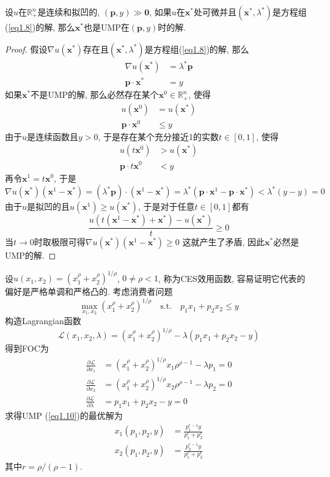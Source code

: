 \documentclass[cn, 12pt, math=mtpro2, bibstyle=apa, blue]{elegantbook}
\newcommand{\R}{\mathbb{R}}
\newcommand{\p}{\mathbf{p}}
\newcommand{\x}{\mathbf{x}}
\begin{document}
\begin{theorem}\label{thm:thm1.7}
  设$u$在$\R_+^n$是连续和拟凹的, $(\p,y)\gg\mathbf{0}$, 如果$u$在$\x^\ast$处可微并且$(\x^\ast,\lambda^\ast)$是方程组(\ref{eq1.8})的解, 那么$\x^\ast$也是UMP在$(\p,y)$时的解.
\end{theorem}
\begin{proof}
  假设$\nabla u(\x^\ast)$存在且$(\x^\ast,\lambda^\ast)$是方程组(\ref{eq1.8})的解, 那么
  \begin{align*}
  \nabla u(\x^\ast)&=\lambda^\ast\p \\
  \p\cdot\x^\ast&=y
  \end{align*}
  如果$\x^\ast$不是UMP的解, 那么必然存在某个$\x^0\in \R^n_+$, 使得
  \begin{align*}
  u(\x^0)&=u(\x^\ast) \\
  \p\cdot\x^0&\leq y
  \end{align*}
  由于$u$是连续函数且$y>0$, 于是存在某个充分接近1的实数$t\in [0,1]$, 使得
  \begin{align*}
  u(t\x^0)&>u(\x^\ast) \\
  \p\cdot t\x^0&<y
  \end{align*}
  再令$\x^1=t\x^0$, 于是
  $$\nabla u(\x^\ast)(\x^1-\x^\ast)=(\lambda^\ast\p)\cdot(\x^1-\x^\ast)=\lambda^\ast(\p\cdot\x^1-\p\cdot\x^\ast)<\lambda^\ast(y-y)=0$$
  由于$u$是拟凹的且$u(\x^1)\geq u(\x^\ast)$, 于是对于任意$t\in[0,1]$都有
  $$\frac{u(t(\x^1-\x^\ast)+\x^\ast)-u(\x^\ast)}{t}\ge0$$
  当$t\to0$时取极限可得$\nabla u(\x^\ast)(\x^1-\x^\ast)\ge 0$
  这就产生了矛盾, 因此$\x^\ast$必然是UMP的解.
\end{proof}
\begin{example}
设$u(x_1,x_2)=(x_1^\rho+x_2^\rho)^{1/\rho}$, $0\ne \rho<1$, 称为CES效用函数, 容易证明它代表的偏好是严格单调和严格凸的. 考虑消费者问题
\begin{equation}\label{eq1.10}
  \max_{x_1,x_2}(x_1^\rho+x_2^\rho)^{1/\rho}\quad \text{s.t.}\quad p_1x_1+p_2x_2\leq y
\end{equation}
构造Lagrangian函数
$$\mathcal{L}(x_1,x_2,\lambda)=(x_1^\rho+x_2^\rho)^{1/\rho}-\lambda(p_1x_1+p_2x_2-y)$$
得到FOC为
\begin{align*}
\frac{\partial \mathcal{L}}{\partial x_1}&=(x_1^\rho+x_2^\rho)^{1/\rho}x_1\rho^{\rho-1}-\lambda p_1=0 \\
\frac{\partial \mathcal{L}}{\partial x_2}&=(x_1^\rho+x_2^\rho)^{1/\rho}x_2\rho^{\rho-1}-\lambda p_2=0 \\
\frac{\partial \mathcal{L}}{\partial \lambda}&=p_1x_1+p_2x_2-y=0
\end{align*}
求得UMP (\ref{eq1.10})的最优解为
\begin{align*}
x_1(p_1,p_2,y)&=\frac{p_1^{r-1}y}{p_1^r+p_2^r} \\
x_2(p_1,p_2,y)&=\frac{p_2^{r-1}y}{p_1^r+p_2^r}
\end{align*}
其中$r=\rho/(\rho-1)$.
\end{example}
\end{document}
